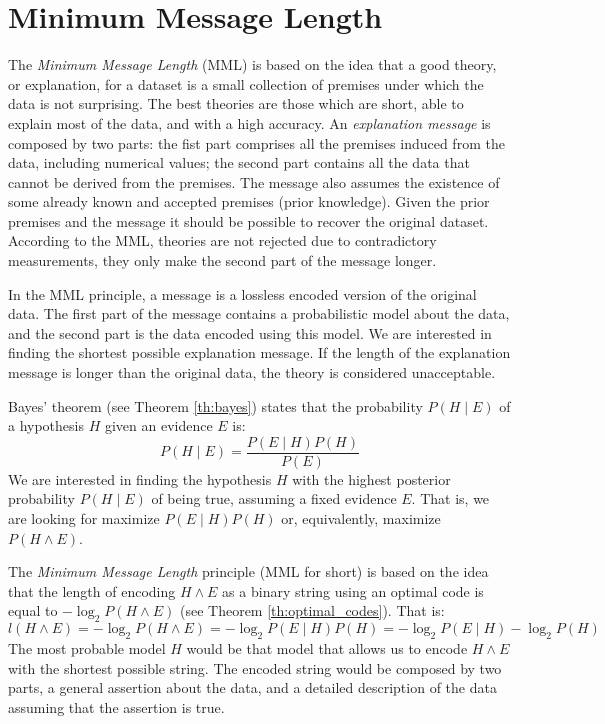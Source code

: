 %
%
\section{Minimum Message Length}
\label{sec:MML}

The \emph{Minimum Message Length} (MML) is based on the idea that a good theory, or explanation, for a dataset is a small collection of premises under which the data is not surprising. The best theories are those which are short, able to explain most of the data, and with a high accuracy. An \emph{explanation message} is composed by two parts: the fist part comprises all the premises induced from the data, including numerical values; the second part contains all the data that cannot be derived from the premises. The message also assumes the existence of some already known and accepted premises (prior knowledge). Given the prior premises and the message it should be possible to recover the original dataset. According to the MML, theories are not rejected due to contradictory measurements, they only make the second part of the message longer.

In the MML principle, a message is a lossless encoded version of the original data. The first part of the message contains a probabilistic model about the data, and the second part is the data encoded using this model. We are interested in finding the shortest possible explanation message. If the length of the explanation message is longer than the original data, the theory is considered unacceptable.

Bayes' theorem (see Theorem \ref{th:bayes}) states that the probability $P(H \mid E)$ of a hypothesis $H$ given an evidence $E$ is:
\[
    P(H \mid E) = \frac{ P( E \mid H ) P(H) }{ P(E) }
\]
We are interested in finding the hypothesis $H$ with the highest posterior probability $P(H \mid E)$ of being true, assuming a fixed evidence $E$. That is, we are looking for maximize $P( E \mid H ) P(H)$ or, equivalently, maximize $P ( H \wedge E )$.

The \emph{Minimum Message Length} principle (MML for short) is based on the idea that the length of encoding $H \wedge E$ as a binary string using an optimal code is equal to $- \log_2 P ( H \wedge E )$ (see Theorem \ref{th:optimal_codes}). That is:
\[
    l(H \wedge E) = - \log_2 P ( H \wedge E ) = - \log_2 P( E \mid H ) P(H) = - \log_2 P( E \mid H ) - \log_2 P(H)
\]
The most probable model $H$ would be that model that allows us to encode $H \wedge E$ with the shortest possible string. The encoded string would be composed by two parts, a general assertion about the data, and a detailed description of the data assuming that the assertion is true.

